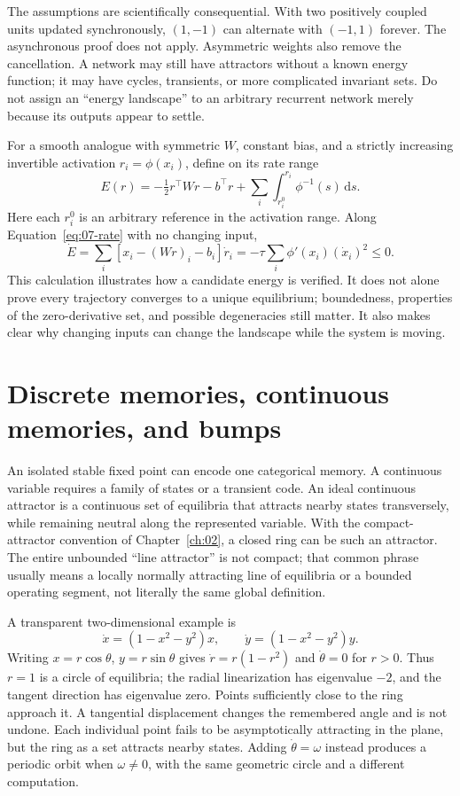 The assumptions are scientifically consequential. With two positively coupled units updated synchronously, $(1,-1)$ can alternate with $(-1,1)$ forever. The asynchronous proof does not apply. Asymmetric weights also remove the cancellation. A network may still have attractors without a known energy function; it may have cycles, transients, or more complicated invariant sets. Do not assign an ``energy landscape'' to an arbitrary recurrent network merely because its outputs appear to settle.

For a smooth analogue with symmetric $W$, constant bias, and a strictly increasing invertible activation $r_i=\phi(x_i)$, define on its rate range
\begin{equation}
 E(r)=-\tfrac12r^\top Wr-b^\top r
       +\sum_i\int_{r_i^0}^{r_i}\phi^{-1}(s)\,\mathrm ds.
\end{equation}
Here each $r_i^0$ is an arbitrary reference in the activation range. Along Equation~\eqref{eq:07-rate} with no changing input,
\begin{equation}
 \dot E=\sum_i[x_i-(Wr)_i-b_i]\dot r_i
       =-\tau\sum_i\phi'(x_i)(\dot x_i)^2\leq0.
\end{equation}
This calculation illustrates how a candidate energy is verified. It does not alone prove every trajectory converges to a unique equilibrium; boundedness, properties of the zero-derivative set, and possible degeneracies still matter. It also makes clear why changing inputs can change the landscape while the system is moving.

\section{Discrete memories, continuous memories, and bumps}
An isolated stable fixed point can encode one categorical memory. A continuous variable requires a family of states or a transient code. An ideal continuous attractor is a continuous set of equilibria that attracts nearby states transversely, while remaining neutral along the represented variable. With the compact-attractor convention of Chapter~\ref{ch:02}, a closed ring can be such an attractor. The entire unbounded ``line attractor'' is not compact; that common phrase usually means a locally normally attracting line of equilibria or a bounded operating segment, not literally the same global definition.

A transparent two-dimensional example is
\begin{equation}
 \dot x=(1-x^2-y^2)x,\qquad
 \dot y=(1-x^2-y^2)y.\label{eq:07-ideal-ring}
\end{equation}
Writing $x=r\cos\theta$, $y=r\sin\theta$ gives $\dot r=r(1-r^2)$ and $\dot\theta=0$ for $r>0$. Thus $r=1$ is a circle of equilibria; the radial linearization has eigenvalue $-2$, and the tangent direction has eigenvalue zero. Points sufficiently close to the ring approach it. A tangential displacement changes the remembered angle and is not undone. Each individual point fails to be asymptotically attracting in the plane, but the ring as a set attracts nearby states. Adding $\dot\theta=\omega$ instead produces a periodic orbit when $\omega\ne0$, with the same geometric circle and a different computation.

